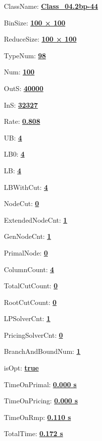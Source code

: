 \documentclass[11pt]{article}
\begin{document}
\pagestyle{empty}


ClassName: \underline{\textbf{Class_04.2bp-44}}
\par
BinSize: \underline{\textbf{100 × 100}}
\par
ReduceSize: \underline{\textbf{100 × 100}}
\par
TypeNum: \underline{\textbf{98}}
\par
Num: \underline{\textbf{100}}
\par
OutS: \underline{\textbf{40000}}
\par
InS: \underline{\textbf{32327}}
\par
Rate: \underline{\textbf{0.808}}
\par
UB: \underline{\textbf{4}}
\par
LB0: \underline{\textbf{4}}
\par
LB: \underline{\textbf{4}}
\par
LBWithCut: \underline{\textbf{4}}
\par
NodeCut: \underline{\textbf{0}}
\par
ExtendedNodeCnt: \underline{\textbf{1}}
\par
GenNodeCnt: \underline{\textbf{1}}
\par
PrimalNode: \underline{\textbf{0}}
\par
ColumnCount: \underline{\textbf{4}}
\par
TotalCutCount: \underline{\textbf{0}}
\par
RootCutCount: \underline{\textbf{0}}
\par
LPSolverCnt: \underline{\textbf{1}}
\par
PricingSolverCnt: \underline{\textbf{0}}
\par
BranchAndBoundNum: \underline{\textbf{1}}
\par
isOpt: \underline{\textbf{true}}
\par
TimeOnPrimal: \underline{\textbf{0.000 s}}
\par
TimeOnPricing: \underline{\textbf{0.000 s}}
\par
TimeOnRmp: \underline{\textbf{0.110 s}}
\par
TotalTime: \underline{\textbf{0.172 s}}
\par
\newpage
\end{document}
